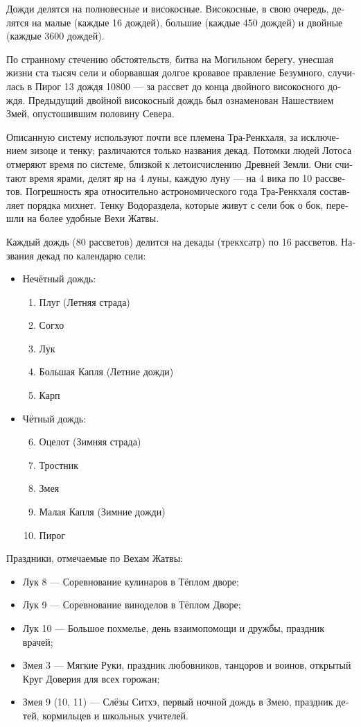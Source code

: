 \documentclass[a4paper,12pt,fleqn]{book}\usepackage{cooltooltips}\usepackage{polyglossia}\setdefaultlanguage[babelshorthands=true]{russian}\setotherlanguage{english}\defaultfontfeatures{Ligatures=TeX,Mapping=tex-text} \usepackage{xcolor}\definecolor{lightgray}{HTML}{bbbbbb}\color{lightgray}\newcommand{\ml}[3]{\textenglish{\textcolor{black}{#3}}}
\begin{document}
{Дожди делятся на полновесные и високосные.
Високосные, в свою очередь, делятся на малые (каждые 16 дождей), большие (каждые 450 дождей) и двойные (каждые 3600 дождей).

По странному стечению обстоятельств, битва на Могильном берегу, унесшая жизни ста тысяч сели и оборвавшая долгое кровавое правление Безумного, случилась в Пирог 13 дождя 10800 --- за рассвет до конца двойного високосного дождя.
Предыдущий двойной високосный дождь был ознаменован Нашествием Змей, опустошившим половину Севера.

Описанную систему используют почти все племена Тра-Ренкхаля, за исключением зизоце и тенку;
различаются только названия декад.
Потомки людей Лотоса отмеряют время по системе, близкой к летоисчислению Древней Земли.
Они считают время ярами, делят яр на 4 луны, каждую луну --- на 4 вика по 10 рассветов.
Погрешность яра относительно астрономического года Тра-Ренкхаля составляет порядка михнет.
Тенку Водораздела, которые живут с сели бок о бок, перешли на более удобные Вехи Жатвы.

Каждый дождь (80 рассветов) делится на декады (трекхсатр) по 16 рассветов.
Названия декад по календарю сели:

\begin{itemize}
\item Нечётный дождь:
\begin{enumerate}
\item Плуг (Летняя страда)
\item Согхо
\item Лук
\item Большая Капля (Летние дожди)
\item Карп
\end{enumerate}
\item Чётный дождь:
\begin{enumerate}
\setcounter{enumi}{5}
\item Оцелот (Зимняя страда)
\item Тростник
\item Змея
\item Малая Капля (Зимние дожди)
\item Пирог
\end{enumerate}
\end{itemize}

Праздники, отмечаемые по Вехам Жатвы:

\begin{itemize}
\item Лук 8 --- Соревнование кулинаров в Тёплом дворе;
\item Лук 9 --- Соревнование виноделов в Тёплом Дворе;
\item Лук 10 --- Большое похмелье, день взаимопомощи и дружбы, праздник врачей;
\item Змея 3 --- Мягкие Руки, праздник любовников, танцоров и воинов, открытый Круг Доверия для всех горожан;
\item Змея 9 (10, 11) --- Слёзы Ситхэ, первый ночной дождь в Змею, праздник детей, кормильцев и школьных учителей.
\end{itemize}

}
\end{document}
